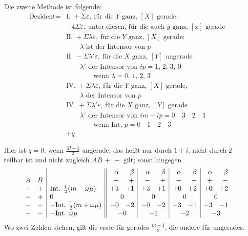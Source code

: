 Die zweite Methode ist folgende:
\[
\begin{aligned}
\text{Dezident}={}&\text{I.}\;+\Sigma\varepsilon,\ \text{für die }Y\text{ ganz, }[X]\text{ gerade}\\
&-4\Sigma\varepsilon,\ \text{unter diesen, für die auch }y\text{ ganz, }[x]\text{ gerade}\\
&\text{II.}\;+\Sigma\lambda\varepsilon,\ \text{für die }Y\text{ ganz, }[X]\text{ gerade;}\\
&\qquad\lambda\text{ ist der Intensor von }p\\
&\text{II.}\;-\Sigma\lambda'\varepsilon,\ \text{für die }X\text{ ganz, }[Y]\text{ ungerade}\\
&\qquad\lambda'\text{ der Intensor von }ip=1,\,2,\,3,\,0\\
&\qquad\qquad\text{wenn }\lambda=0,\,1,\,2,\,3\\
&\text{IV.}\;+\Sigma\lambda\varepsilon,\ \text{für die }Y\text{ ganz, }[X]\text{ gerade,}\\
&\qquad\lambda\text{ der Intensor von }p\\
&\text{IV.}\;+\Sigma\lambda'\varepsilon,\ \text{für die }X\text{ ganz, }[Y]\text{ gerade}\\
&\qquad\lambda'\text{ der Intensor von }im-ip=0\quad3\quad2\quad1\\
&\qquad\qquad\text{wenn Int. }p=0\quad1\quad2\quad3\\
&+q
\end{aligned}
\]

Hier ist $q=0$, wenn $\frac{M-1}{2}$ ungerade, das heißt nur durch $1+i$, nicht durch $2$ teilbar ist und nicht zugleich $AB\,+\,-$ gilt; sonst hingegen
\begingroup\small\setlength{\arraycolsep}{2pt}
\[
\begin{array}{cc|l||rr|rr|rr|rr}
&&&\alpha&\beta&\alpha&\beta&\alpha&\beta&\alpha&\beta\\
A&B&&+&+&-&+&-&-&+&-\\
+&+&\text{Int. }\frac12(m-\omega\mu)&+3&+1&+3&+1&+0&+2&+0&+2\\
-&+&0&\multicolumn{2}{c|}{0}&\multicolumn{2}{c|}{0}&\multicolumn{2}{c|}{0}&\multicolumn{2}{c}{0}\\
-&-&-\text{Int. }\frac12(m+\omega\mu)&-0&-2&-0&-2&-3&-1&-3&-1\\
+&-&-\text{Int. }\omega\mu&\multicolumn{2}{c|}{-0}&\multicolumn{2}{c|}{-1}&\multicolumn{2}{c|}{-2}&\multicolumn{2}{c}{-3}
\end{array}
\]
\endgroup
Wo zwei Zahlen stehen, gilt die erste für gerades $\frac{m-1}{2}$, die andere für ungerades.

